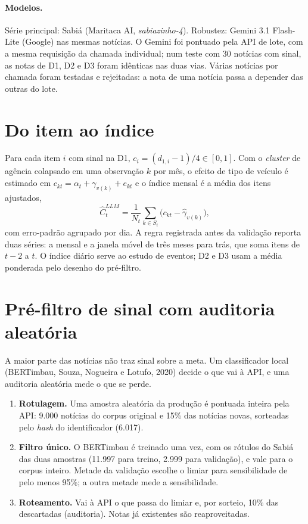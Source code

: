 \documentclass[11pt,a4paper]{article}
\newcommand{\Cllm}{\hat{C}^{LLM}_t}
\begin{document}
\paragraph{Modelos.} Série principal: Sabiá (Maritaca AI, \emph{sabiazinho-4}).
Robustez: Gemini 3.1 Flash-Lite (Google) nas mesmas notícias. O Gemini foi
pontuado pela API de lote, com a mesma requisição da chamada individual; num
teste com 30 notícias com sinal, as notas de D1, D2 e D3 foram idênticas nas
duas vias. Várias notícias por chamada foram testadas e rejeitadas: a nota de
uma notícia passa a depender das outras do lote.

\section{Do item ao índice}\label{sec:agregacao}

Para cada item $i$ com sinal na D1, $c_i=(d_{1,i}-1)/4\in[0,1]$. Com o
\emph{cluster} de agência colapsado em uma observação $k$ por mês, o efeito de
tipo de veículo é estimado em $c_{kt}=\alpha_t+\gamma_{v(k)}+e_{kt}$ e o índice
mensal é a média dos itens ajustados,
\begin{equation}
  \Cllm = \frac{1}{N_t}\sum_{k\in S_t}\bigl(c_{kt}-\hat\gamma_{v(k)}\bigr),
\end{equation}
com erro-padrão agrupado por dia. A regra registrada antes da validação reporta
duas séries: a mensal e a janela móvel de três meses para trás, que soma itens
de $t-2$ a $t$. O índice diário serve ao estudo de eventos; D2 e D3 usam a
média ponderada pelo desenho do pré-filtro.

\section{Pré-filtro de sinal com auditoria aleatória}\label{sec:filtro}

A maior parte das notícias não traz sinal sobre a meta. Um classificador local
(BERTimbau, Souza, Nogueira e Lotufo, 2020) decide o que vai à API, e uma
auditoria aleatória mede o que se perde.

\begin{enumerate}[leftmargin=2em,itemsep=0.15em]
  \item \textbf{Rotulagem.} Uma amostra aleatória da produção é pontuada
  inteira pela API: 9.000 notícias do corpus original e 15\% das notícias
  novas, sorteadas pelo \emph{hash} do identificador (6.017).
  \item \textbf{Filtro único.} O BERTimbau é treinado uma vez, com os rótulos
  do Sabiá das duas amostras (11.997 para treino, 2.999 para validação), e
  vale para o corpus inteiro. Metade da validação escolhe o limiar para
  sensibilidade de pelo menos 95\%; a outra metade mede a sensibilidade.
  \item \textbf{Roteamento.} Vai à API o que passa do limiar e, por sorteio,
  10\% das descartadas (auditoria). Notas já existentes são reaproveitadas.
\end{enumerate}
\end{document}
